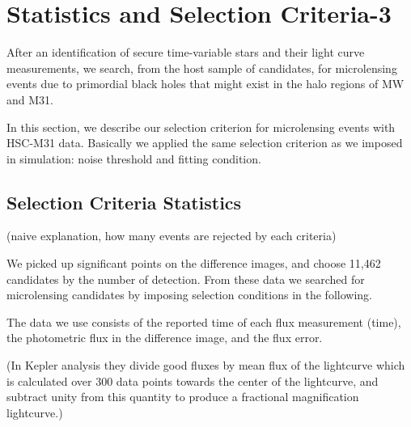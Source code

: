 \documentclass[iop, apj]{emulateapj}
\newcommand{\?}{\stackrel{?}{=}}
\begin{document}
\section{Statistics and Selection Criteria-3}
\label{sec:res2}
After an identification of secure time-variable stars and their light curve measurements, 
we search, from the host sample of candidates, for microlensing events due to primordial black holes that might exist in the halo regions of MW and M31. 


In this section, we describe our selection criterion for microlensing events with HSC-M31 data. 
Basically we applied the same selection criterion as we imposed in simulation: 
noise threshold and fitting condition. 


\subsection{Selection Criteria Statistics}
(naive explanation, how many events are rejected by each criteria)

We picked up significant points on the difference images, 
and choose 11,462 candidates by the number of detection. 
From these data we searched for microlensing candidates by imposing selection conditions in the following. 

The data we use consists of the reported time of each flux measurement (time), 
the photometric flux in the difference image, and the flux error. 

(In Kepler analysis they divide good fluxes by mean flux of the lightcurve 
which is calculated over 300 data points towards the center of the lightcurve, 
and subtract unity from this quantity to produce a fractional magnification lightcurve.)
\end{document}
